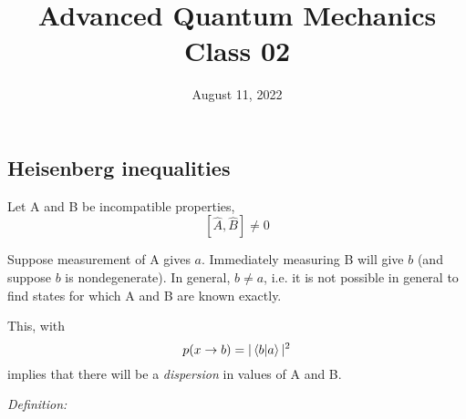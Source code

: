 \documentclass[12pt]{article}
\title{Advanced Quantum Mechanics\\Class 02}
\date{August 11, 2022}                                           %
\begin{document}
\maketitle

\setcounter{section}{3}
\setcounter{equation}{15}


\subsection{Heisenberg inequalities}

Let A and B be incompatible properties,
\[
[\hat{A}, \hat{B}] \neq 0
\]

Suppose measurement of A gives $a$. Immediately
measuring B will give $b$ (and suppose $b$ is nondegenerate). 
In general, $b \neq a$, i.e.
it is not possible in general to find states for which A and B are known exactly. 


This, with
\[
p(x \rightarrow b)=| \bra{b}\ket{a} |^{2}
\]
implies that there will be a \emph{dispersion} in values of A and B.

\emph{Definition:}
\end{document}
